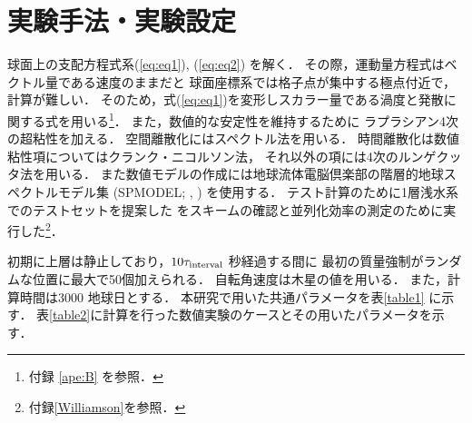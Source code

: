 \documentclass[a4j,12pt,openbib,oneside]{jreport}
\begin{document}
\section{実験手法・実験設定}
\label{sec:model2}
球面上の支配方程式系(\ref{eq:eq1}), (\ref{eq:eq2}) を解く．
その際，運動量方程式はベクトル量である速度のままだと
球面座標系では格子点が集中する極点付近で，計算が難しい．
そのため，式(\ref{eq:eq1})を変形しスカラー量である渦度と発散に関する式を用いる\footnote{付録 \ref{ape:B} を参照．}．
%
また，数値的な安定性を維持するために
ラプラシアン4次の超粘性を加える．
%
空間離散化にはスペクトル法を用いる．
時間離散化は数値粘性項についてはクランク・ニコルソン法，
それ以外の項には4次のルンゲクッタ法を用いる．
%
また数値モデルの作成には地球流体電脳倶楽部の階層的地球スペクトルモデル集
(SPMODEL; \cite{spmodel2006}, \cite{spmodel2013}) を使用する．
テスト計算のために1層浅水系でのテストセットを提案した
\cite{Williamson1992}をスキームの確認と並列化効率の測定のために実行した\footnote{付録\ref{Williamson}を参照．}．

初期に上層は静止しており，$10 \tau_{{\rm{interval}}}$ 秒経過する間に
最初の質量強制がランダムな位置に最大で50個加えられる．
%
自転角速度は木星の値を用いる．
また，計算時間は3000 地球日とする．
%
本研究で用いた共通パラメータを表\ref{table1} に示す．
表\ref{table2}に計算を行った数値実験のケースとその用いたパラメータを示す．
\end{document}

